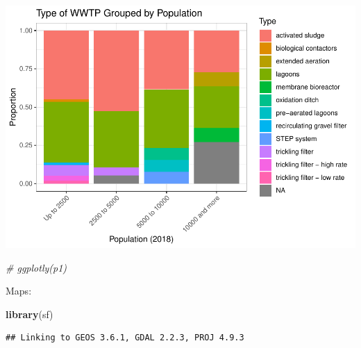 \documentclass[
]{article}
\newenvironment{Shaded}{\begin{snugshade}}{\end{snugshade}}
\newcommand{\CommentTok}[1]{\textcolor[rgb]{0.56,0.35,0.01}{\textit{#1}}}
\newcommand{\KeywordTok}[1]{\textcolor[rgb]{0.13,0.29,0.53}{\textbf{#1}}}
\newcommand{\NormalTok}[1]{#1}
\begin{document}
\includegraphics{data-viz_files/figure-latex/unnamed-chunk-6-2.pdf}

\begin{Shaded}
\begin{Highlighting}[]
\CommentTok{# ggplotly(p1)}
\end{Highlighting}
\end{Shaded}

Maps:

\begin{Shaded}
\begin{Highlighting}[]
\KeywordTok{library}\NormalTok{(sf)}
\end{Highlighting}
\end{Shaded}

\begin{verbatim}
## Linking to GEOS 3.6.1, GDAL 2.2.3, PROJ 4.9.3
\end{verbatim}
\end{document}
